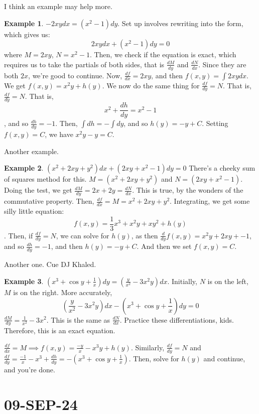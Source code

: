 \documentclass{article}
\theoremstyle{definition}
\newtheorem{example}{Example}[section]
\begin{document}
I think an example may help more.
\begin{example}
    $-2xy dx = (x^2-1)dy$. Set up involves rewriting into the form, which gives us:
    \[2xy dx + (x^2-1)dy = 0\] where $M = 2xy$, $N = x^2 -1$. Then, we check if the equation is exact, which requires us to take the partials of both sides, that is $\frac{dM}{dy}$ and $\frac{dN}{dx}$. Since they are both $2x$, we're good to continue. 
    Now, $\frac{df}{dx} = 2xy$, and then $f(x,y) = \int{2xy}dx$. We get $f(x,y) = x^2y + h(y)$. We now do the same thing for $\frac{df}{dy} = N$. That is, $\frac{df}{dy} = N$. That is, \[x^2 + \frac{dh}{dy} = x^2 - 1\], and so $\frac{dh}{dy} = -1$. Then, $\int{dh} = -\int{dy}$, and so $h(y) = -y + C$. Setting $f(x,y) = C$, we have $x^2y - y = C$. 
\end{example}
Another example. 
\begin{example}
    $(x^2 + 2xy + y^2)dx + (2xy+x^2-1)dy = 0$
    There's a cheeky sum of squares method for this. 
    $M = (x^2 + 2xy + y^2)$ and $N = (2xy+x^2-1)$. Doing the test, we get $\frac{dM}{dy} = 2x + 2y = \frac{dN}{dx}$. This is true, by the wonders of the commutative property. Then, $\frac{df}{dx} = M = x^2 + 2xy + y^2$. Integrating, we get some silly little equation:
    \[f(x,y) = \frac{1}{3}x^3 + x^2y + xy^2 + h(y) \]. Then, if $\frac{df}{dy} = N$, we can solve for $h(y)$, as then $\frac{d}{dy}{f(x,y)} = x^2y + 2xy + - 1$, and so $\frac{dh}{dy} = -1$, and then $h(y) = -y + C$. And then we set $f(x,y) = C$. 
\end{example}
Another one. Cue DJ Khaled. 
\begin{example}
    $(x^3 + \cos{y} + \frac{1}{x})dy = (\frac{y}{x^2}-3x^2y)dx$. Initially, $N$ is on the left, $M$ is on the right.
    More accurately, 
    \[
        (\frac{y}{x^2}-3x^2y)dx - (x^3 + \cos{y} + \frac{1}{x})dy = 0
    \]
    $\frac{dM}{dy} = \frac{1}{x^2} - 3x^2$. This is the same as $\frac{dN}{dx}$. Practice these differentiations, kids. Therefore, this is an exact equation. 

    $\frac{df}{dx} = M \implies f(x,y) = \frac{-y}{x} - x^3y + h(y)$. Similarly, $\frac{df}{dy} = N$ and $\frac{df}{dy} = \frac{-1}{x} - x^3 + \frac{dh}{dy} = - (x^3 + \cos{y} + \frac{1}{x})$. Then, solve for $h(y)$ and continue, and you're done. 

\end{example}
\section{09-SEP-24}
\end{document}
